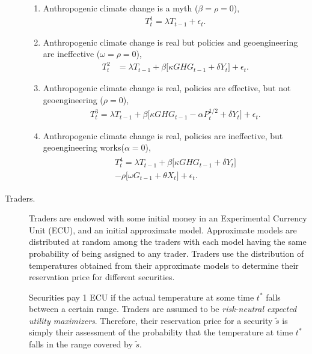 \documentclass{sig-alternate}
\begin{document}
\begin{description}
		\begin{enumerate}
			\setlength\itemsep{0em}
			\item Anthropogenic climate change is a myth ($\beta = \rho = 0$),
			\begin{align}
			T^1_t = \lambda T_{t-1} +  \epsilon_t.
			\end{align}
			\item Anthropogenic climate change is real but policies and geoengineering are ineffective ($\omega = \rho = 0$),
			\begin{align}
			T^2_t & = \lambda T_{t-1} + \beta \big[ \kappa GHG_{t-1}  + \delta Y_t  \big] +  \epsilon_t.
			\end{align}
			\item Anthropogenic climate change is real, policies are effective, but not geoengineering ($\rho = 0$),
			\begin{align}
			T^3_t = \lambda T_{t-1} + \beta \big[ \kappa GHG_{t-1} - \alpha P_t^{1/2} + \delta Y_t  \big] +  \epsilon_t.
			\end{align}
			\item Anthropogenic climate change is real, policies are ineffective, but geoengineering works($\alpha = 0$),
			\begin{align}
			\begin{split}
		T^4_t = \lambda T_{t-1} + \beta \big[ \kappa GHG_{t-1} + \delta Y_t  \big]\\ - \rho \big[ \omega G_{t-1} + \theta X_{t} \big] +  \epsilon_t.
			\end{split}
			\end{align}
			
		\end{enumerate}
		
		\item[ Traders.] Traders are endowed with some initial money in an Experimental Currency Unit (ECU), and an initial approximate model. Approximate models are distributed at random among the traders with each model having the same probability of being assigned to any trader.  Traders use the distribution of temperatures obtained from their approximate models to determine their reservation price for different securities. 
		
		Securities pay 1 ECU  if the actual temperature at some time $t^*$ falls between a certain range. Traders are assumed to be \emph{risk-neutral expected utility maximizers}. Therefore, their reservation price for a security $\tilde{s}$ is simply their assessment of the probability that the temperature at time $t^*$ falls in the range covered by $\tilde{s}$.
		

\end{description}
\end{document}
